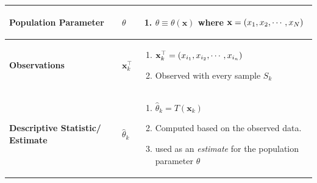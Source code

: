 \begin{customArrayStretch}{1.3}
\begin{longtable}{>{\RaggedRight\arraybackslash}p{4cm} >{\centering\arraybackslash}p{0.5cm} p{10.5cm}}
\textbf{Population Parameter} &
    $\theta$ &
    \begin{minipage}{10.3cm}
        \vspace{0.15cm}
        \begin{enumerate}
            \item $\theta \equiv \theta(\mathbf{x})$ where $\mathbf{x} = \left(x_1, x_2, \cdots, x_N\right)$
            \hfill \cite{statistics/book/Statistics-for-Data-Scientists/Maurits-Kaptein}
            
        \end{enumerate}
        \vspace{0.15cm}
    \end{minipage} 
    \\ \hline


\textbf{Observations} &
    $\mathbf{x}_k^\top$ &
    \begin{minipage}{10.3cm}
        \vspace{0.15cm}
        \begin{enumerate}
            \item $\mathbf{x}_k^\top = \left(x_{i_1}, x_{i_2}, \cdots, x_{i_n}\right)$
            \hfill \cite{statistics/book/Statistics-for-Data-Scientists/Maurits-Kaptein}

            \item Observed with every sample $S_k$
            \hfill \cite{statistics/book/Statistics-for-Data-Scientists/Maurits-Kaptein}
        \end{enumerate}
        \vspace{0.15cm}
    \end{minipage} 
    \\ \hline

\textbf{Descriptive Statistic/ Estimate} &
    $\hat{\theta}_k$ &
    \begin{minipage}{10.3cm}
        \vspace{0.15cm}
        \begin{enumerate}
            \item $\hat{\theta}_k = T(\mathbf{x}_k)$
            \hfill \cite{statistics/book/Statistics-for-Data-Scientists/Maurits-Kaptein}

            \item Computed based on the observed data.
            \hfill \cite{statistics/book/Statistics-for-Data-Scientists/Maurits-Kaptein}

            \item used as an \textit{estimate} for the population parameter $\theta$
            \hfill \cite{statistics/book/Statistics-for-Data-Scientists/Maurits-Kaptein}
            

\end{enumerate}
\end{minipage}
\end{longtable}
\end{customArrayStretch}
